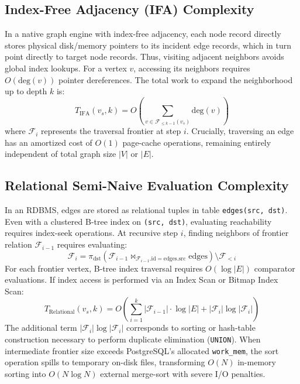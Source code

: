 \documentclass[conference,10pt]{IEEEtran}%
\begin{document}
\subsection{Index-Free Adjacency (IFA) Complexity}
In a native graph engine with index-free adjacency, each node record directly stores physical disk/memory pointers to its incident edge records, which in turn point directly to target node records. Thus, visiting adjacent neighbors avoids global index lookups.
For a vertex $v$, accessing its neighbors requires $O(\text{deg}(v))$ pointer dereferences. The total work to expand the neighborhood up to depth $k$ is:
\begin{equation}
T_{\text{IFA}}(v_s, k) = O\left( \sum_{v \in \mathcal{F}_{\le k-1}(v_s)} \text{deg}(v) \right)
\end{equation}
where $\mathcal{F}_i$ represents the traversal frontier at step $i$. Crucially, traversing an edge has an amortized cost of $O(1)$ page-cache operations, remaining entirely independent of total graph size $|V|$ or $|E|$.

\subsection{Relational Semi-Naive Evaluation Complexity}
In an RDBMS, edges are stored as relational tuples in table \texttt{edges(src, dst)}. Even with a clustered B-tree index on \texttt{(src, dst)}, evaluating reachability requires index-seek operations.
At recursive step $i$, finding neighbors of frontier relation $\mathcal{F}_{i-1}$ requires evaluating:
\begin{equation}
\mathcal{F}_i = \pi_{\text{dst}} \left( \mathcal{F}_{i-1} \bowtie_{\mathcal{F}_{i-1}.\text{id} = \text{edges}.\text{src}} \text{edges} \right) \setminus \mathcal{F}_{<i}
\end{equation}
For each frontier vertex, B-tree index traversal requires $O(\log |E|)$ comparator evaluations. If index access is performed via an Index Scan or Bitmap Index Scan:
\begin{equation}
T_{\text{Relational}}(v_s, k) = O\left( \sum_{i=1}^k |\mathcal{F}_{i-1}| \cdot \log |E| + |\mathcal{F}_i| \log |\mathcal{F}_i| \right)
\end{equation}
The additional term $|\mathcal{F}_i| \log |\mathcal{F}_i|$ corresponds to sorting or hash-table construction necessary to perform duplicate elimination (\texttt{UNION}). When intermediate frontier size exceeds PostgreSQL's allocated \texttt{work\_mem}, the sort operation spills to temporary on-disk files, transforming $O(N)$ in-memory sorting into $O(N \log N)$ external merge-sort with severe I/O penalties.
\end{document}
